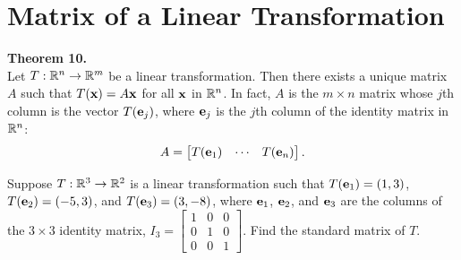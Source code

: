 \newpage


\section[The Matrix of a Linear Transformation]{Matrix of a Linear Transformation}
\name[2in]

\begin{boxthm}
	\textbf{Theorem 10.} \\
	Let $T:\mathbb{R}^n\to\mathbb{R}^m$ be a linear transformation. Then there exists a unique matrix $A$ such that $T(\boldsymbol{\mathbf{x}})=A\boldsymbol{\mathbf{x}}$ for all $\boldsymbol{\mathbf{x}}$ in $\mathbb{R}^n$. In fact, $A$ is the $m\times n$ matrix whose $j$th column is the vector $T(\boldsymbol{\mathbf{e}}_{j})$, where $\boldsymbol{\mathbf{e}}_{j}$ is the $j$th column of the identity matrix in $\mathbb{R}^n$:
	$$ A = \begin{bmatrix}T(\boldsymbol{\mathbf{e}}_{1}) & \cdots & T(\boldsymbol{\mathbf{e}}_{n})\end{bmatrix}. $$
\end{boxthm}

\begin{exercise} %
	Suppose $T:\mathbb{R}^{3}\to\mathbb{R}^{2}$ is a linear transformation such that $T(\boldsymbol{\mathbf{e}}_{1})=(1,3)$, $T(\boldsymbol{\mathbf{e}}_{2})=(-5,3)$, and $T(\boldsymbol{\mathbf{e}}_{3})=(3,-8)$, where $\boldsymbol{\mathbf{e}}_{1}$, $\boldsymbol{\mathbf{e}}_{2}$, and $\boldsymbol{\mathbf{e}}_{3}$ are the columns of the $3\times 3$ identity matrix, $I_3=\begin{bmatrix}1&0&0\\0&1&0\\0&0&1\end{bmatrix}$. Find the standard matrix of $T$.
\end{exercise}
\vfill


